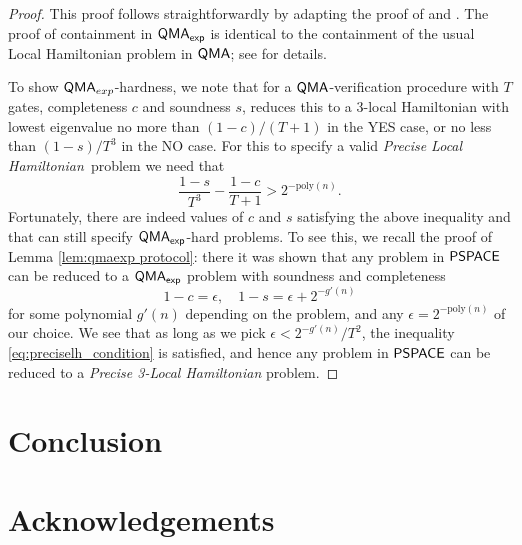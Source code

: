 \documentclass[11pt]{article}
\theoremstyle{definition}
\theoremstyle{remark}
\newcommand\QMA{{\sf{QMA}}}
\newcommand\PSPACE{{\sf{PSPACE}}}
\newcommand\QMAexp{{\sf{QMA}_{exp}}}
\newcommand\preciselh{\textit{Precise Local Hamiltonian}}
\newcommand\preciseilh[1]{\textit{Precise #1-Local Hamiltonian}}
\newcommand{\poly}{\textrm{poly}}
\begin{document}
\begin{proof}
This proof follows straightforwardly by adapting the proof of \cite{ksv02} and \cite{kr03}. The proof of containment in $\QMAexp$ is identical to the containment of the usual Local Hamiltonian problem in $\QMA$; see \cite{ksv02} for details.

To show $\QMA_{exp}$-hardness, we note that for a $\QMA$-verification procedure with $T$ gates, completeness $c$ and soundness $s$, \cite{kr03} reduces this to a 3-local Hamiltonian with lowest eigenvalue no more than $(1-c) / (T+1)$ in the YES case, or no less than $(1-s) / T^3$ in the NO case. For this to specify a valid \preciselh \ problem we need that
\begin{equation} \label{eq:preciselh_condition}
\frac{1-s}{T^3} - \frac{1-c}{T+1} > 2^{-\poly(n)}.
\end{equation}
Fortunately, there are indeed values of $c$ and $s$ satisfying the above inequality and that can still specify $\QMAexp$-hard problems. To see this, we recall the proof of Lemma \ref{lem:qmaexp protocol}: there it was shown that any problem in $\PSPACE$ can be reduced to a $\QMAexp$ problem with soundness and completeness
\begin{equation}
1-c = \epsilon,\quad 1 - s = \epsilon + 2^{-g'(n)}
\end{equation}
for some polynomial $g'(n)$ depending on the problem, and any $\epsilon = 2^{-\poly(n)}$ of our choice. We see that as long as we pick $\epsilon < 2^{-g'(n)}/T^2$, the inequality \ref{eq:preciselh_condition} is satisfied, and hence any problem in $\PSPACE$ can be reduced to a \preciseilh{3} problem.
\end{proof}

\section{Conclusion}
\section{Acknowledgements}



\end{document}

